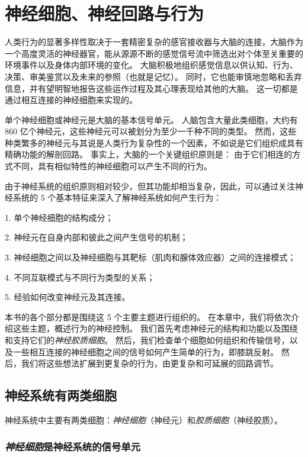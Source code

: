 \chapter{神经细胞、神经回路与行为} \label{chap:chap3}


人类行为的显著多样性取决于一套精密复杂的感官接收器与大脑的连接，大脑作为一个高度灵活的神经器官，能从源源不断的感觉信号流中筛选出对个体至关重要的环境事件以及身体内部环境的变化。
大脑积极地组织感觉信息以供认知、行为、决策、审美鉴赏以及未来的参照（也就是记忆）。
同时，它也能审慎地忽略和丢弃信息，并有望明智地报告这些运作过程及其心理表现给其他的大脑。
这一切都是通过相互连接的神经细胞来实现的。


单个神经细胞或神经元是大脑的基本信号单元。 
人脑包含大量此类细胞，大约有 860 亿个神经元，这些神经元可以被划分为至少一千种不同的类型。 
然而，这些种类繁多的神经元与其说是人类行为复杂性的一个因素，不如说是它们组织成具有精确功能的解剖回路。 
事实上，大脑的一个关键组织原则是：
由于它们相连的方式不同，具有相似特性的神经细胞可以产生不同的行为。


由于神经系统的组织原则相对较少，但其功能却相当复杂，因此，可以通过关注神经系统的 5 个基本特征来深入了解神经系统如何产生行为：

1. 单个神经细胞的结构成分；

2. 神经元在自身内部和彼此之间产生信号的机制；

3. 神经细胞之间以及神经细胞与其靶标（肌肉和腺体效应器）之间的连接模式；

4. 不同互联模式与不同行为类型的关系；

5. 经验如何改变神经元及其连接。


本书的各个部分都是围绕这 5 个主要主题进行组织的。
在本章中，我们将依次介绍这些主题，概述行为的神经控制。
我们首先考虑神经元的结构和功能以及围绕和支持它们的\textit{神经胶质细胞}。
然后，我们检查单个细胞如何组织和传输信号，以及一些相互连接的神经细胞之间的信号如何产生简单的行为，即膝跳反射。
然后，我们将这些想法扩展到更复杂的行为，由更复杂和可延展的回路调节。



\section{神经系统有两类细胞}

神经系统中主要有两类细胞：\textit{神经细胞}（神经元）和\textit{胶质细胞}（神经胶质）。


\subsection{\textit{神经细胞}是神经系统的信号单元}

